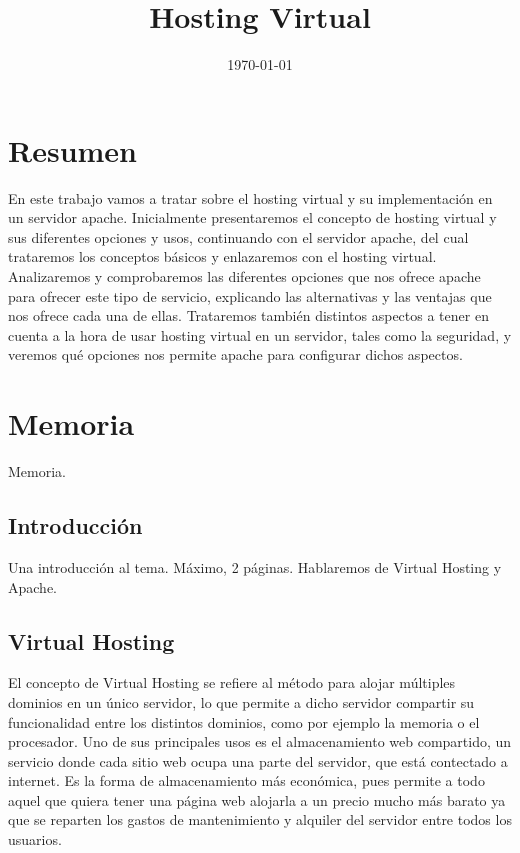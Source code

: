 \documentclass[a4paper, 10pt]{article} %
\title{\textbf{Hosting Virtual}} %
\date{\today} %
\begin{document}
\maketitle
\tableofcontents
\pagebreak

\section{Resumen}

En este trabajo vamos a tratar sobre el hosting virtual y su implementación en un servidor apache. Inicialmente presentaremos el concepto de hosting virtual y sus diferentes opciones y usos, continuando con el servidor apache, del cual trataremos los conceptos básicos y enlazaremos con el hosting virtual. Analizaremos y comprobaremos las diferentes opciones que nos ofrece apache para ofrecer este tipo de servicio, explicando las alternativas y las ventajas que nos ofrece cada una de ellas. Trataremos también distintos aspectos a tener en cuenta a la hora de usar hosting virtual en un servidor, tales como la seguridad, y veremos qué opciones nos permite apache para configurar dichos aspectos. 

\section{Memoria}

Memoria. 

\subsection{Introducción}

Una introducción al tema. Máximo, 2 páginas. Hablaremos de Virtual Hosting y Apache. 

\subsection{Virtual Hosting}

El concepto de Virtual Hosting se refiere al método para alojar múltiples dominios en un único servidor, lo que permite a dicho servidor compartir su funcionalidad entre los distintos dominios, como por ejemplo la memoria o el procesador. Uno de sus principales usos es el almacenamiento web compartido, un servicio donde cada sitio web ocupa una parte del servidor, que está contectado a internet. Es la forma de almacenamiento más económica, pues permite a todo aquel que quiera tener una página web alojarla a un precio mucho más barato ya que se reparten los gastos de mantenimiento y alquiler del servidor entre todos los usuarios. 
\end{document}
